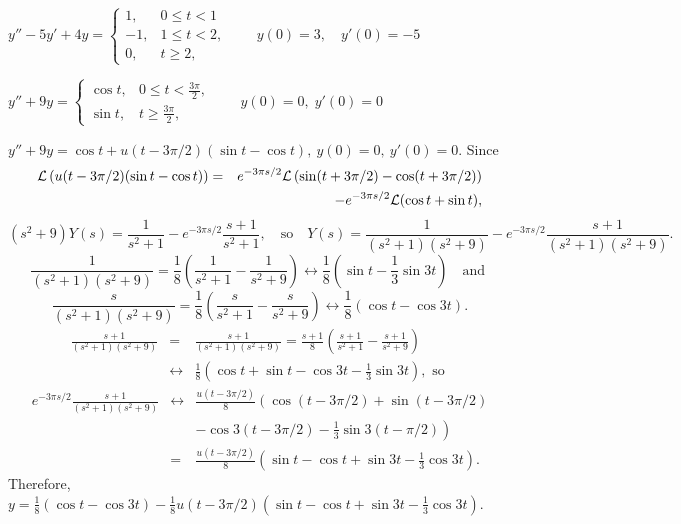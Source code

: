 \documentclass{ximera}
\begin{document}
\begin{problem}\label{exer:8.5.7} $y''-5y'+4y= \left\{\begin{array}{rl} 1,&0\le
t<1\\ -1,&1\le t<2,\\ 0,&t\ge 2,\end{array}\right.\qquad
y(0)=3,\quad y'(0)=-5$
\end{problem}

\begin{problem}\label{exer:8.5.8} $y''+9y= \left\{\begin{array}{cl} \cos
t,&0\le t<\frac{3\pi}{2},\\ \sin
t,&t\ge\frac{3\pi}{2},\end{array}\right.\qquad y(0)=0,\;  y'(0)=0$

\begin{solution}
$y''+9y=\cos t+u(t-3\pi/2)(\sin t-\cos t),\ y(0)=0,\
y'(0)=0$. Since
\begin{eqnarray*}
{\cal L}\left(u(t-3\pi/2)(\sin t-\cos t)\right)&=&
e^{-3\pi s/2}{\cal
L}\left(\sin(t+3\pi/2)-\cos(t+3\pi/2)\right)\\
&&-e^{-3\pi s/2}{\cal L}(\cos t+\sin t),
\end{eqnarray*}
$$
(s^2+9)Y(s)=\frac{1}{s^2+1}-e^{-3\pi s/2}\frac{s+1}{s^2+1},\quad \mbox{so} \quad
Y(s)=\frac{1}{(s^2+1)(s^2+9)}-e^{-3\pi s/2}\frac{s+1}{(s^2+1)(s^2+9)}.
$$
$$
\frac{1}{(s^2+1)(s^2+9)}=\frac{1}{8}\left(\frac{1}{s^2+1}-\frac{1}{s^2+9}\right)\leftrightarrow\frac{1}{8}\left(\sin
t-\frac{1}{3}\sin3t\right) \quad \mbox{and }
$$
$$
\frac{s}{(s^2+1)(s^2+9)}=\frac{1}{8}\left(\frac{s}{s^2+1}-\frac{s}{s^2+9}\right)\leftrightarrow\frac{1}{8}\left(\cos
t-\cos3t\right).
$$
\begin{eqnarray*}
\frac{s+1}{(s^2+1)(s^2+9)}&=&\frac{s+1}{(s^2+1)(s^2+9)}=
\frac{s+1}{8}\left(\frac{s+1}{s^2+1}-\frac{s+1}{s^2+9}\right)\\ &\leftrightarrow&\frac{1}{8}\left(\cos t+\sin
t-\cos3t-\frac{1}{3}\sin3t\right),\mbox{ so }
\end{eqnarray*}
\begin{eqnarray*}
e^{-3\pi s/2}\frac{s+1}{(s^2+1)(s^2+9)}&\leftrightarrow&
\frac{u(t-3\pi/2)}{8}\left(\cos(t-3\pi/2)+\sin(t-3\pi/2)\right.\\
&&\left. -\cos3(t-3\pi/2)-\frac{1}{3}\sin3(t-\pi/2)\right)\\
&=&\frac{u(t-3\pi/2)}{8}\left(\sin t-\cos t+
\sin3t-\frac{1}{3}\cos3t\right).
\end{eqnarray*}
Therefore,
$y=\frac{1}{8}\left(\cos t-\cos3t\right)
-\frac{1}{8} u(t-3\pi/2)\left(\sin t-\cos t+
\sin 3t-\frac{1}{3}\cos 3t\right)$.
\end{solution}
\end{problem}
\end{document}

